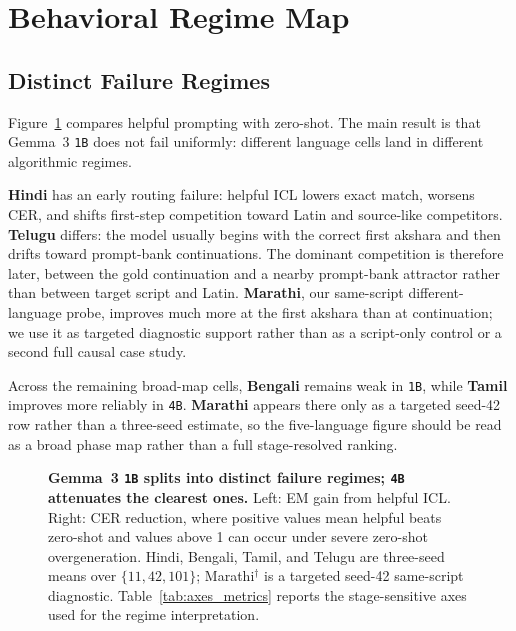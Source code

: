 \documentclass{article}
\begin{document}
\section{Behavioral Regime Map}\label{sec:behavior}

\subsection{Distinct Failure Regimes}

Figure~\ref{fig:behavior} compares helpful prompting with zero-shot. The main result is that Gemma~3 \texttt{1B} does not fail uniformly: different language cells land in different algorithmic regimes.

\textbf{Hindi} has an early routing failure: helpful ICL lowers exact match, worsens CER, and shifts first-step competition toward Latin and source-like competitors. \textbf{Telugu} differs: the model usually begins with the correct first akshara and then drifts toward prompt-bank continuations. The dominant competition is therefore later, between the gold continuation and a nearby prompt-bank attractor rather than between target script and Latin. \textbf{Marathi}, our same-script different-language probe, improves much more at the first akshara than at continuation; we use it as targeted diagnostic support rather than as a script-only control or a second full causal case study.

Across the remaining broad-map cells, \textbf{Bengali} remains weak in \texttt{1B}, while \textbf{Tamil} improves more reliably in \texttt{4B}. \textbf{Marathi} appears there only as a targeted seed-42 row rather than a three-seed estimate, so the five-language figure should be read as a broad phase map rather than a full stage-resolved ranking.

\begin{figure}[t]
    \centering
    \resizebox{0.98\textwidth}{!}{}
    \caption{\textbf{Gemma~3 \texttt{1B} splits into distinct failure regimes; \texttt{4B} attenuates the clearest ones.} Left: EM gain from helpful ICL. Right: CER reduction, where positive values mean helpful beats zero-shot and values above 1 can occur under severe zero-shot overgeneration. Hindi, Bengali, Tamil, and Telugu are three-seed means over $\{11,42,101\}$; Marathi$^{\dagger}$ is a targeted seed-42 same-script diagnostic. Table~\ref{tab:axes_metrics} reports the stage-sensitive axes used for the regime interpretation.}
    \label{fig:behavior}
\end{figure}
\end{document}
